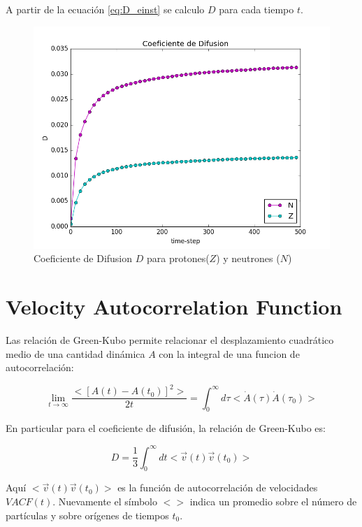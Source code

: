 \documentclass[
 reprint,
 amsmath,amssymb,
 aps,
 a4paper
]{revtex4-1}
\begin{document}
A partir de la ecuación \ref{eq:D_einst} se calculo $D$ para cada tiempo $t$.

\begin{figure}[H]
\centerline{
  \includegraphics[width=1.0\linewidth]{dif.png}}
  \caption{\small Coeficiente de Difusion $D$ para protones($Z$) y neutrones ($N$)}
  \label{fig:D_t400}
\end{figure}

\section{\label{seq:vaf}Velocity Autocorrelation Function}

Las relación de Green-Kubo permite relacionar el desplazamiento cuadrático medio de una cantidad dinámica $A$ con la integral de una funcion de autocorrelación:

 \begin{equation}\label{eq:GK}
 \lim_{t \to \infty} \frac{<[A(t)-A(t_0)]^2>}{2t}=\int_{0}^{\infty}d\tau<\dot{A}(\tau)\dot{A}(\tau_0)>
\end{equation}

En particular para el coeficiente de difusión, la relación de Green-Kubo es:

 \begin{equation}\label{eq:GK_D}
 D=\frac{1}{3}\int_{0}^{\infty}dt<\vec{v}(t)\vec{v}(t_0)>
\end{equation}

Aquí $<\vec{v}(t)\vec{v}(t_0)>$ es la función de autocorrelación de velocidades $VACF(t)$. Nuevamente el símbolo $<>$ indica un promedio sobre el número de partículas y sobre orígenes de tiempos $t_0$.
\end{document}
